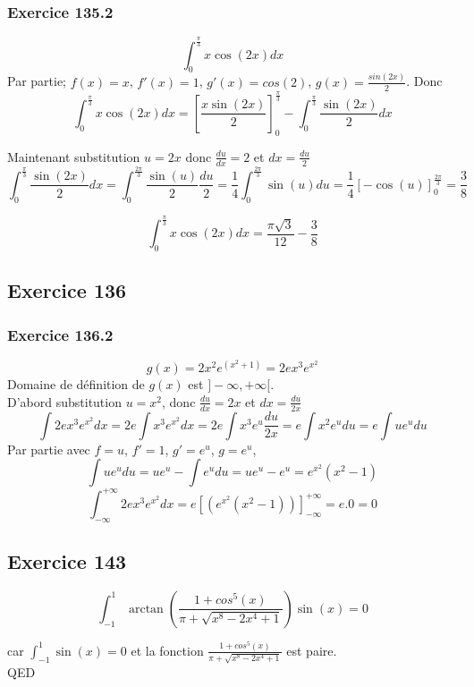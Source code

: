 \documentclass[]{book}
\theoremstyle{definition}
\begin{document}
\subsubsection*{Exercice 135.2}
$$\int_{0}^{\frac{\pi}{3}}{x\cos(2x)dx}$$
Par partie; $f(x) = x$, $f'(x)=1$, $g'(x)=cos(2)$, $g(x)=\frac{sin(2x)}{2}$. Donc
$$\int_{0}^{\frac{\pi}{3}}{x\cos(2x)}dx = \left[\frac{x\sin(2x)}{2}\right]_{0}^{\frac{\pi}{3}} - \int_{0}^{\frac{\pi}{3}}{\frac{\sin(2x)}{2}dx}$$

Maintenant substitution $u=2x$ donc $\frac{du}{dx}=2$ et $dx=\frac{du}{2}$
$$\int_{0}^{\frac{\pi}{3}}{\frac{\sin(2x)}{2}}dx = \int_{0}^{\frac{2\pi}{3}}{\frac{\sin(u)}{2}\frac{du}{2}} = \frac{1}{4}\int_{0}^{\frac{2\pi}{3}}{\sin(u)du} = \frac{1}{4}\left[-\cos(u)\right]_{0}^{\frac{2\pi}{3}} = \frac{3}{8}$$

$$\int_{0}^{\frac{\pi}{3}}{x\cos(2x)dx} = 	\frac{\pi\sqrt{3}}{12}-\frac{3}{8}$$


\subsection*{Exercice 136}
\subsubsection*{Exercice 136.2}
$$g(x)=2x^2e^{(x^2+1)} = 2ex^3e^{x^2}$$
Domaine de d\'efinition de $g(x)$ est $]-\infty,+\infty[$.\\
D'abord substitution $u=x^2$, donc $\frac{du}{dx}=2x$ et $dx=\frac{du}{2x}$
$$\int{2ex^3e^{x^2}dx} = 2e\int{x^3e^{x^2}dx} = 2e\int{x^3e^{u}\frac{du}{2x}} = e\int{x^2e^{u}du} = e\int{ue^{u}du}$$
Par partie avec $f = u$, $f' = 1$, $g' = e^{u}$, $g = e^{u}$, 
$$\int{ue^{u}du} =  ue^u - \int{e^{u}du} = ue^u - e^u = e^{x^2}(x^2-1)$$
$$\int_{-\infty}^{+\infty}{2ex^3e^{x^2}dx} = e\left[(e^{x^2}(x^2-1))\right]_{-\infty}^{+\infty} = e.0 = 0$$


\subsection*{Exercice 143}
$$\int_{-1}^{1}{\arctan(\frac{1+cos^5(x)}{\pi+\sqrt{x^8-2x^4+1}})\sin(x)} = 0$$

car $\int_{-1}^{1}{\sin(x)} = 0$ et la fonction $\frac{1+cos^5(x)}{\pi+\sqrt{x^8-2x^4+1}}$ est paire.\\


QED
\end{document}
